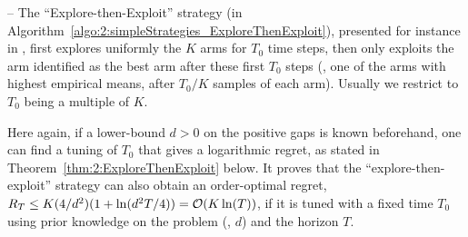 -- The ``\textcolor{deepgold}{Explore-then-Exploit}'' strategy (in Algorithm~\ref{algo:2:simpleStrategies_ExploreThenExploit}), presented for instance in \cite{Bubeck12}, first explores uniformly the $K$ arms for $T_0$ time steps, then only exploits the arm identified as the best arm after these first $T_0$ steps
(\ie, one of the arms with highest empirical means, after $T_0/K$ samples of each arm).
Usually we restrict to $T_0$ being a multiple of $K$.

Here again, if a lower-bound $d>0$ on the positive gaps is known beforehand, one can find a tuning of $T_0$ that gives a logarithmic regret, as stated in Theorem~\ref{thm:2:ExploreThenExploit} below.
It proves that the ``explore-then-exploit'' strategy can also obtain an order-optimal regret, $R_T \leq K (4/d^2) (1 + \ln(d^2 T / 4)) = \mathop{}\mathopen{}\mathcal{O}\mathopen{}\left(K \ln(T)\right)$, if it is tuned with a fixed time $T_0$ using prior knowledge on the problem (\ie, $d$) and the horizon $T$.
%

